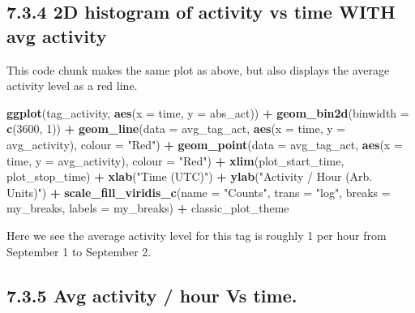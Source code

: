\documentclass[
]{book}
\newenvironment{Shaded}{\begin{snugshade}}{\end{snugshade}}
\newcommand{\AttributeTok}[1]{\textcolor[rgb]{0.13,0.29,0.53}{#1}}
\newcommand{\DecValTok}[1]{\textcolor[rgb]{0.00,0.00,0.81}{#1}}
\newcommand{\FunctionTok}[1]{\textcolor[rgb]{0.13,0.29,0.53}{\textbf{#1}}}
\newcommand{\NormalTok}[1]{#1}
\newcommand{\SpecialCharTok}[1]{\textcolor[rgb]{0.81,0.36,0.00}{\textbf{#1}}}
\newcommand{\StringTok}[1]{\textcolor[rgb]{0.31,0.60,0.02}{#1}}
\begin{document}
\subsection{7.3.4 2D histogram of activity vs time WITH avg activity}\label{d-histogram-of-activity-vs-time-with-avg-activity}

This code chunk makes the same plot as above, but also displays the average activity level as a red line.

\begin{Shaded}
\begin{Highlighting}[]
\FunctionTok{ggplot}\NormalTok{(tag\_activity, }
       \FunctionTok{aes}\NormalTok{(}\AttributeTok{x =}\NormalTok{ time, }
           \AttributeTok{y =}\NormalTok{ abs\_act)) }\SpecialCharTok{+}
 \FunctionTok{geom\_bin2d}\NormalTok{(}\AttributeTok{binwidth =} \FunctionTok{c}\NormalTok{(}\DecValTok{3600}\NormalTok{, }\DecValTok{1}\NormalTok{)) }\SpecialCharTok{+}
  \FunctionTok{geom\_line}\NormalTok{(}\AttributeTok{data =}\NormalTok{ avg\_tag\_act, }
            \FunctionTok{aes}\NormalTok{(}\AttributeTok{x =}\NormalTok{ time, }
                \AttributeTok{y =}\NormalTok{ avg\_activity),}
            \AttributeTok{colour =} \StringTok{"Red"}\NormalTok{) }\SpecialCharTok{+}
  \FunctionTok{geom\_point}\NormalTok{(}\AttributeTok{data =}\NormalTok{ avg\_tag\_act, }
             \FunctionTok{aes}\NormalTok{(}\AttributeTok{x =}\NormalTok{ time, }
                 \AttributeTok{y =}\NormalTok{ avg\_activity), }
             \AttributeTok{colour =} \StringTok{"Red"}\NormalTok{) }\SpecialCharTok{+}
  \FunctionTok{xlim}\NormalTok{(plot\_start\_time, }
\NormalTok{       plot\_stop\_time) }\SpecialCharTok{+}
  \FunctionTok{xlab}\NormalTok{(}\StringTok{"Time (UTC)"}\NormalTok{) }\SpecialCharTok{+}
  \FunctionTok{ylab}\NormalTok{(}\StringTok{"Activity / Hour (Arb. Units)"}\NormalTok{) }\SpecialCharTok{+}
  \FunctionTok{scale\_fill\_viridis\_c}\NormalTok{(}\AttributeTok{name =} \StringTok{"Counts"}\NormalTok{, }
                       \AttributeTok{trans =} \StringTok{"log"}\NormalTok{, }
                       \AttributeTok{breaks =}\NormalTok{ my\_breaks, }
                       \AttributeTok{labels =}\NormalTok{ my\_breaks) }\SpecialCharTok{+}
\NormalTok{  classic\_plot\_theme}
\end{Highlighting}
\end{Shaded}

Here we see the average activity level for this tag is roughly 1 per hour from September 1 to September 2.

\subsection{7.3.5 Avg activity / hour Vs time.}\label{avg-activity-hour-vs-time.}
\end{document}
